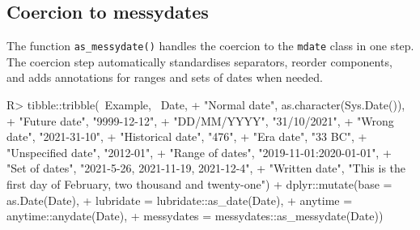 \documentclass[
]{jss}
\begin{document}
\hypertarget{coercion-to-messydates}{%
\subsection{Coercion to messydates}\label{coercion-to-messydates}}

The function \texttt{as\_messydate()} handles the coercion to the
\texttt{mdate} class in one step. The coercion step automatically
standardises separators, reorder components, and adds annotations for
ranges and sets of dates when needed.

\begin{CodeChunk}
\begin{CodeInput}
R> tibble::tribble(~Example, ~Date,
+                 "Normal date", as.character(Sys.Date()),
+                 "Future date", "9999-12-12",
+                 "DD/MM/YYYY", "31/10/2021",
+                 "Wrong date", "2021-31-10",
+                 "Historical date", "476",
+                 "Era date", "33 BC",
+                 "Unspecified date", "2012-01",
+                 "Range of dates", "2019-11-01:2020-01-01",
+                 "Set of dates", "2021-5-26, 2021-11-19, 2021-12-4",
+                 "Written date", "This is the first day of February, two thousand and twenty-one") %
+   dplyr::mutate(base = as.Date(Date),
+                 lubridate = lubridate::as_date(Date),
+                 anytime = anytime::anydate(Date),
+                 messydates = messydates::as_messydate(Date))
\end{CodeInput}
\begin{CodeOutput}
# A tibble: 10 x 6
   Example          Date                base       lubridate  anytime    messy~1
   <chr>            <chr>               <date>     <date>     <date>     <mdate>
 1 Normal date      2022-11-11          2022-11-11 2022-11-11 2022-11-11 2022-1~
 2 Future date      9999-12-12          9999-12-12 9999-12-12 9999-12-12 9999-1~
 3 DD/MM/YYYY       31/10/2021          NA         NA         NA         2021-1~
 4 Wrong date       2021-31-10          NA         NA         NA         2021-3~
 5 Historical date  476                 NA         NA         NA         0476  ~
 6 Era date         33 BC               NA         NA         NA         -0033 ~
 7 Unspecified date 2012-01             NA         2020-12-01 2012-01-01 2012-0~
 8 Range of dates   2019-11-01:2020-01~ 2019-11-01 2019-11-01 2019-11-01 2019-1~
 9 Set of dates     2021-5-26, 2021-11~ 2021-05-26 NA         2021-05-26 {2021-~
10 Written date     This is the first ~ NA         NA         NA         2021-0~
# ... with abbreviated variable name 1: messydates
\end{CodeOutput}
\end{CodeChunk}
\end{document}
